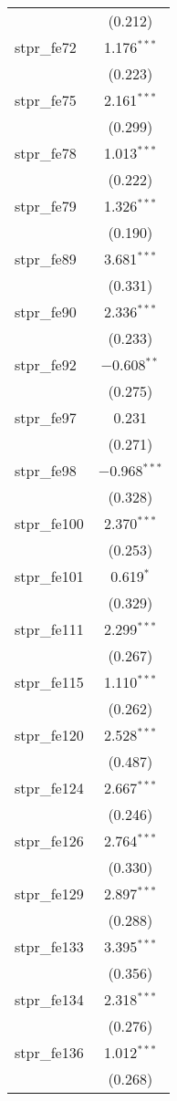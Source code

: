 \begin{table}[!htbp]
\begin{tabular}{@{\extracolsep{5pt}}lc}
  & (0.212) \\ 
  stpr\_fe72 & 1.176$^{***}$ \\ 
  & (0.223) \\ 
  stpr\_fe75 & 2.161$^{***}$ \\ 
  & (0.299) \\ 
  stpr\_fe78 & 1.013$^{***}$ \\ 
  & (0.222) \\ 
  stpr\_fe79 & 1.326$^{***}$ \\ 
  & (0.190) \\ 
  stpr\_fe89 & 3.681$^{***}$ \\ 
  & (0.331) \\ 
  stpr\_fe90 & 2.336$^{***}$ \\ 
  & (0.233) \\ 
  stpr\_fe92 & $-$0.608$^{**}$ \\ 
  & (0.275) \\ 
  stpr\_fe97 & 0.231 \\ 
  & (0.271) \\ 
  stpr\_fe98 & $-$0.968$^{***}$ \\ 
  & (0.328) \\ 
  stpr\_fe100 & 2.370$^{***}$ \\ 
  & (0.253) \\ 
  stpr\_fe101 & 0.619$^{*}$ \\ 
  & (0.329) \\ 
  stpr\_fe111 & 2.299$^{***}$ \\ 
  & (0.267) \\ 
  stpr\_fe115 & 1.110$^{***}$ \\ 
  & (0.262) \\ 
  stpr\_fe120 & 2.528$^{***}$ \\ 
  & (0.487) \\ 
  stpr\_fe124 & 2.667$^{***}$ \\ 
  & (0.246) \\ 
  stpr\_fe126 & 2.764$^{***}$ \\ 
  & (0.330) \\ 
  stpr\_fe129 & 2.897$^{***}$ \\ 
  & (0.288) \\ 
  stpr\_fe133 & 3.395$^{***}$ \\ 
  & (0.356) \\ 
  stpr\_fe134 & 2.318$^{***}$ \\ 
  & (0.276) \\ 
  stpr\_fe136 & 1.012$^{***}$ \\ 
  & (0.268) \\ 

\end{tabular}
\end{table}
